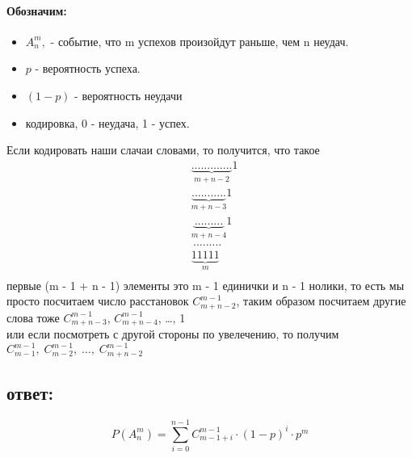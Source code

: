 \documentclass[a4paper, 12pt]{article} %
\begin{document}
\paragraph{Обозначим:}
\begin{itemize}
    \item $A^m_n, $ - событие, что m успехов произойдут раньше, чем n неудач.
    \item $p$ - вероятность успеха.
    \item $(1 - p)$ - вероятность неудачи
    \item кодировка, 0 - неудача, 1 - успех.
\end{itemize}
Если кодировать наши слачаи словами, то получится, что такое
\begin{align*}
    &\underbrace{.............}_{m + n - 2}1 \\
    &\underbrace{...........}_{m + n - 3}1 \\
    &\underbrace{.........}_{m + n - 4}1 \\
    &\, .........\\
    &\underbrace{11111}_{m}\\
\end{align*}
первые (m - 1 + n - 1) элементы
это m - 1 единички и n - 1 нолики,
то есть мы просто посчитаем число расстановок $C^{m-1}_{m + n - 2}$, 
таким образом посчитаем другие слова тоже $C^{m-1}_{m + n - 3}$, 
$C^{m-1}_{m + n - 4}$, \ldots, 1 \\
или если посмотреть с другой стороны по увелечению, то получим \\
$C^{m - 1}_{m - 1}, \; C^{m - 1}_{m - 2},\; \ldots,\; C^{m-1}_{m + n - 2}$

\subsection*{ответ:}
\begin{equation*}
    P(A^m_n) = \sum^{n -1}_{i = 0} C^{m - 1}_{m - 1 + i} \cdot (1 - p)^i \cdot  p^m
\end{equation*}
\end{document}
